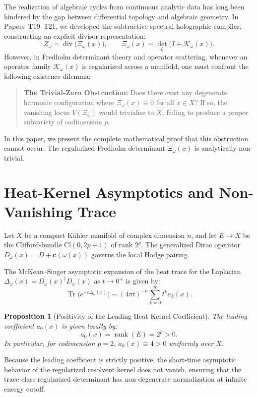 \documentclass[11pt,a4paper]{article}
\newtheorem{proposition}[theorem]{Proposition}
\theoremstyle{definition}
\begin{document}
The realization of algebraic cycles from continuous analytic data has long been hindered by the gap between differential topology and algebraic geometry. In Papers~T19--T21, we developed the subtractive spectral holographic compiler, constructing an explicit divisor representation:
\begin{equation}
  Z_\omega = \operatorname{div}\bigl( \Xi_\omega(x) \bigr), \qquad \Xi_\omega(x) = \operatorname{det}_\zeta\bigl( I + \mathcal{K}_\omega(x) \bigr).
\end{equation}
However, in Fredholm determinant theory and operator scattering, whenever an operator family $\mathcal{K}_\omega(x)$ is regularized across a manifold, one must confront the following existence dilemma:
\begin{quote}
\textbf{The Trivial-Zero Obstruction:} Does there exist any degenerate harmonic configuration where $\Xi_\omega(x) \equiv 0$ for all $x \in X$? If so, the vanishing locus $V(\Xi_\omega)$ would trivialise to $X$, failing to produce a proper subvariety of codimension $p$.
\end{quote}
In this paper, we present the complete mathematical proof that this obstruction cannot occur. The regularized Fredholm determinant $\Xi_\omega(x)$ is analytically non-trivial.

\section{Heat-Kernel Asymptotics and Non-Vanishing Trace}

Let $X$ be a compact K\"ahler manifold of complex dimension $n$, and let $E \to X$ be the Clifford-bundle $\mathrm{Cl}(0, 2p+1)$ of rank $2^p$. The generalized Dirac operator $D_\omega(x) = D + \mathbf{c}(\omega(x))$ governs the local Hodge pairing.

The McKean--Singer asymptotic expansion of the heat trace for the Laplacian $\Delta_\omega(x) = D_\omega(x)^\dagger D_\omega(x)$ as $t \to 0^+$ is given by:
\begin{equation}
  \operatorname{Tr}\bigl( e^{-t \Delta_\omega(x)} \bigr) \sim (4\pi t)^{-n} \sum_{k=0}^\infty t^k a_k(x).
\end{equation}
\begin{proposition}[Positivity of the Leading Heat Kernel Coefficient]
The leading coefficient $a_0(x)$ is given locally by:
\begin{equation}
  a_0(x) = \operatorname{rank}(E) = 2^p > 0.
\end{equation}
In particular, for codimension $p=2$, $a_0(x) \equiv 4 > 0$ uniformly over $X$.
\end{proposition}
Because the leading coefficient is strictly positive, the short-time asymptotic behavior of the regularized resolvent kernel does not vanish, ensuring that the trace-class regularized determinant has non-degenerate normalization at infinite energy cutoff.
\end{document}
